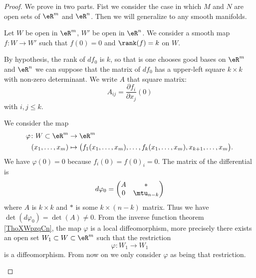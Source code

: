 \begin{proof}
    We prove in two parts. Fist we consider the case in which \( M\) and \( N\) are open sets of \( \eR^m\) and \( \eR^n\). Then we will generalize to any smooth manifolds.
    \begin{subproof}
            Let \( W\) be open in \( \eR^m\), \( W'\) be open in \( \eR^n\). We consider a smooth map \( f\colon W\to W'\) such that \( f(0)=0\) and \( \rank(f)=k\) on \( W\).

            By hypothesis, the rank of \( df_0\) is \( k\), so that is one chooses good bases on \( \eR^m\) and \( \eR^n\) we can suppose that the matrix of \( df_0\) has a upper-left square \( k\times k\) with non-zero determinant. We write \( A\) that square matrix:
            \begin{equation}
                A_{ij}=\frac{ \partial f_i }{ \partial x_j }(0)
            \end{equation}
            with \( i,j\leq k\).

            \begin{subproof}

                    We consider the map
                    \begin{equation}
                        \begin{aligned}
                            \varphi\colon W\subset \eR^m&\to \eR^m \\
                            (x_1,\ldots, x_m)&\mapsto \big( f_1(x_1,\ldots, x_m),\ldots, f_k(x_1,\ldots, x_m),x_{k+1},\ldots, x_m \big). 
                        \end{aligned}
                    \end{equation}
                    We have \( \varphi(0)=0\) because \( f_i(0)=f(0)_i=0\). The matrix of the differential is
                    \begin{equation}
                        d\varphi_0=\begin{pmatrix}
                            A    &   *    \\ 
                            0    &   \mtu_{n-k}    
                        \end{pmatrix}
                    \end{equation}
                    where \( A\) is \( k\times k\) and \( *\) is some \( k\times (n-k)\) matrix. Thus we have \( \det(d\varphi_0)=\det(A)\neq 0\). From the inverse function theorem \ref{ThoXWpzqCn}, the map \( \varphi\) is a local diffeomorphism, more precisely there exists an open set \( W_1\subset W\subset \eR^m\) such that the restriction
                    \begin{equation}
                        \varphi\colon W_1\to W_1
                    \end{equation}
                    is a diffeomorphism. From now on we only consider \( \varphi\) as being that restriction.


\end{subproof}
\end{subproof}
\end{proof}
